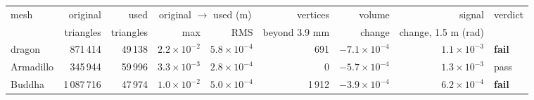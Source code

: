 \begin{tabular}{lrrrrrrrl}
\toprule
mesh & original & used & \multicolumn{2}{c}{original $\to$ used (m)} & vertices & volume & signal & verdict \\
\cmidrule(lr){4-5}
 & triangles & triangles & max & RMS & beyond 3.9 mm & change & change, 1.5 m (rad) & \\
\midrule
dragon & 871\,414 & 49\,138 & $2.2\times10^{-2}$ & $5.8\times10^{-4}$ & 691 & $-7.1\times10^{-4}$ & $1.1\times10^{-3}$ & \textbf{fail} \\
Armadillo & 345\,944 & 59\,996 & $3.3\times10^{-3}$ & $2.8\times10^{-4}$ & 0 & $-5.7\times10^{-4}$ & $1.3\times10^{-3}$ & pass \\
Buddha & 1\,087\,716 & 47\,974 & $1.0\times10^{-2}$ & $5.0\times10^{-4}$ & 1\,912 & $-3.9\times10^{-4}$ & $6.2\times10^{-4}$ & \textbf{fail} \\
\bottomrule
\end{tabular}
